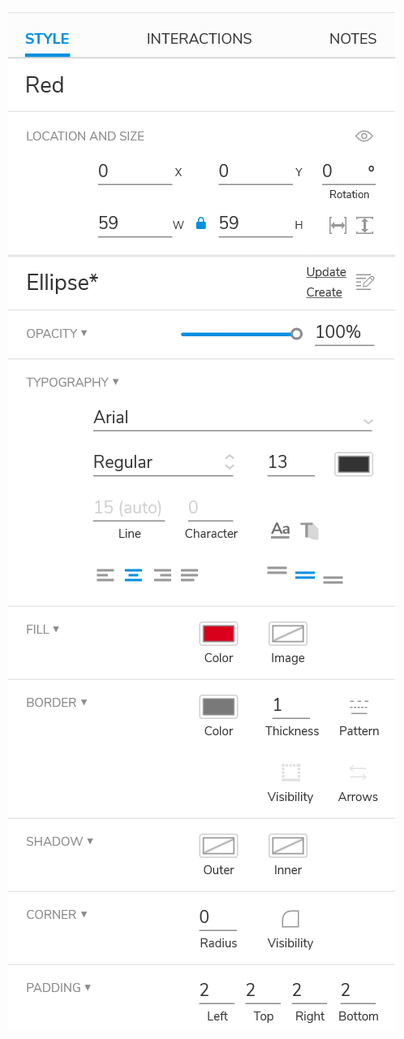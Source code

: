 \begin{center}
  \includegraphics[scale=0.4]{figures/AXURE_Style.PNG}
  \label{fig:Axure_Style}
\end{center}

